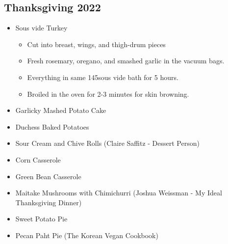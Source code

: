 \subsection*{Thanksgiving 2022}
\begin{itemize}        
	\item Sous vide Turkey
		\begin{itemize}        
			\item Cut into breast, wings, and thigh-drum pieces
			\item Fresh rosemary, oregano, and smashed garlic in the vacuum bags.
			\item Everything in same 145\faren sous vide bath for 5 hours.
			\item Broiled in the oven for 2-3 minutes for skin browning.
		\end{itemize}        
	\item Garlicky Mashed Potato Cake
	\item Duchess Baked Potatoes
	\item Sour Cream and Chive Rolls (Claire Saffitz - Dessert Person)
	\item Corn Casserole
	\item Green Bean Casserole
	\item Maitake Mushrooms with Chimichurri (Joshua Weissman - My Ideal Thanksgiving Dinner)
	\item Sweet Potato Pie
	\item Pecan Paht Pie (The Korean Vegan Cookbook)
\end{itemize}        
